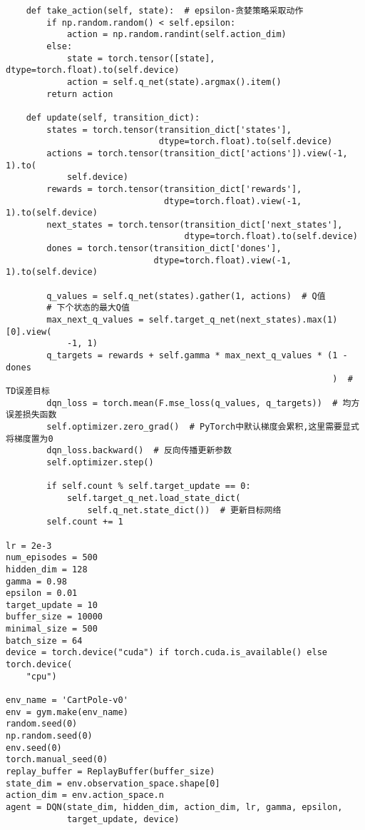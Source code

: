 \begin{lstlisting}
    def take_action(self, state):  # epsilon-贪婪策略采取动作
        if np.random.random() < self.epsilon:
            action = np.random.randint(self.action_dim)
        else:
            state = torch.tensor([state], dtype=torch.float).to(self.device)
            action = self.q_net(state).argmax().item()
        return action

    def update(self, transition_dict):
        states = torch.tensor(transition_dict['states'],
                              dtype=torch.float).to(self.device)
        actions = torch.tensor(transition_dict['actions']).view(-1, 1).to(
            self.device)
        rewards = torch.tensor(transition_dict['rewards'],
                               dtype=torch.float).view(-1, 1).to(self.device)
        next_states = torch.tensor(transition_dict['next_states'],
                                   dtype=torch.float).to(self.device)
        dones = torch.tensor(transition_dict['dones'],
                             dtype=torch.float).view(-1, 1).to(self.device)

        q_values = self.q_net(states).gather(1, actions)  # Q值
        # 下个状态的最大Q值
        max_next_q_values = self.target_q_net(next_states).max(1)[0].view(
            -1, 1)
        q_targets = rewards + self.gamma * max_next_q_values * (1 - dones
                                                                )  # TD误差目标
        dqn_loss = torch.mean(F.mse_loss(q_values, q_targets))  # 均方误差损失函数
        self.optimizer.zero_grad()  # PyTorch中默认梯度会累积,这里需要显式将梯度置为0
        dqn_loss.backward()  # 反向传播更新参数
        self.optimizer.step()

        if self.count % self.target_update == 0:
            self.target_q_net.load_state_dict(
                self.q_net.state_dict())  # 更新目标网络
        self.count += 1

lr = 2e-3
num_episodes = 500
hidden_dim = 128
gamma = 0.98
epsilon = 0.01
target_update = 10
buffer_size = 10000
minimal_size = 500
batch_size = 64
device = torch.device("cuda") if torch.cuda.is_available() else torch.device(
    "cpu")

env_name = 'CartPole-v0'
env = gym.make(env_name)
random.seed(0)
np.random.seed(0)
env.seed(0)
torch.manual_seed(0)
replay_buffer = ReplayBuffer(buffer_size)
state_dim = env.observation_space.shape[0]
action_dim = env.action_space.n
agent = DQN(state_dim, hidden_dim, action_dim, lr, gamma, epsilon,
            target_update, device)


\end{lstlisting}
